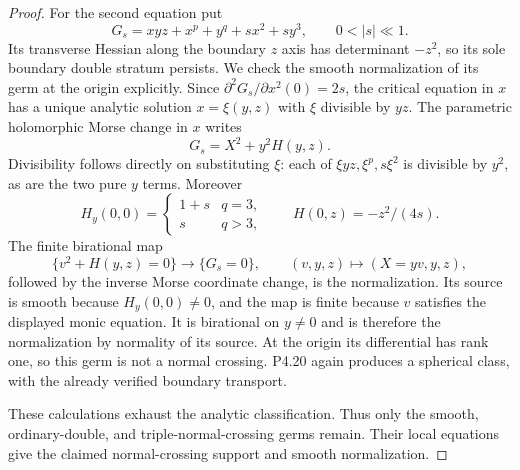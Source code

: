 \begin{proof}
For the second equation put
\[
 G_s=xyz+x^p+y^q+s x^2+s y^3,
 \qquad 0<|s|\ll1.
\]
Its transverse Hessian along the boundary
$z$ axis has determinant $-z^2$,
so its sole boundary double stratum
persists. We check the smooth normalization
of its germ at the origin explicitly.
Since $\partial^2G_s/\partial x^2(0)=2s$,
the critical equation in $x$ has a unique
analytic solution $x=\xi(y,z)$ with
$\xi$ divisible by $yz$. The parametric
holomorphic Morse change in $x$ writes
\[
 G_s=X^2+y^2H(y,z).
\]
Divisibility follows directly on substituting
$\xi$: each of $\xi yz,\xi^p,s\xi^2$
is divisible by $y^2$, as are the two
pure $y$ terms. Moreover
\[
 H_y(0,0)=
 \begin{cases}1+s&q=3,\\s&q>3,\end{cases}
 \qquad H(0,z)=-z^2/(4s).
\]
The finite
birational map
\[
 \{v^2+H(y,z)=0\}\longrightarrow\{G_s=0\},
 \qquad (v,y,z)\longmapsto(X=yv,y,z),
\]
followed by the inverse Morse coordinate
change, is the normalization. Its source
is smooth because $H_y(0,0)\ne0$,
and the map is finite because $v$
satisfies the displayed monic equation.
It is birational on $y\ne0$ and is
therefore the normalization by normality
of its source. At the origin its
differential has rank one, so this germ
is not a normal crossing. P4.20 again
produces a spherical class, with the
already verified boundary transport.

These calculations exhaust the analytic
classification. Thus only the smooth,
ordinary-double, and triple-normal-crossing
germs remain. Their local equations give
the claimed normal-crossing support and
smooth normalization.
\end{proof}
